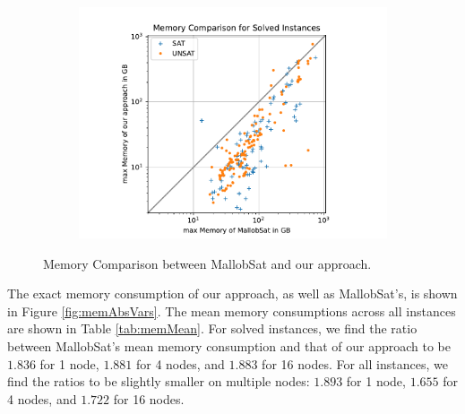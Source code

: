 \documentclass[12pt,a4paper,twoside]{scrartcl}
\numberwithin{equation}{section}
\begin{document}
\begin{figure}
\begin{subfigure}[c]{.45\textwidth}
    \includegraphics[scale=.45]{plots/square_mem_compare/square_mem_16node.pdf}
    \label{fig:memCompare16node}
  \end{subfigure}
  \caption{Memory Comparison between MallobSat and our approach.}
  \label{fig:memCompare}
\end{figure}

The exact memory consumption of our approach, as well as MallobSat's, is shown in Figure \ref{fig:memAbsVars}. The mean memory consumptions across all instances are shown in Table \ref{tab:memMean}. For solved instances, we find the ratio between MallobSat's mean memory consumption and that of our approach to be $1.836$ for 1 node, $1.881$ for 4 nodes, and $1.883$ for 16 nodes. For all instances, we find the ratios to be slightly smaller on multiple nodes: $1.893$ for 1 node, $1.655$ for 4 nodes, and $1.722$ for 16 nodes.
\end{document}
